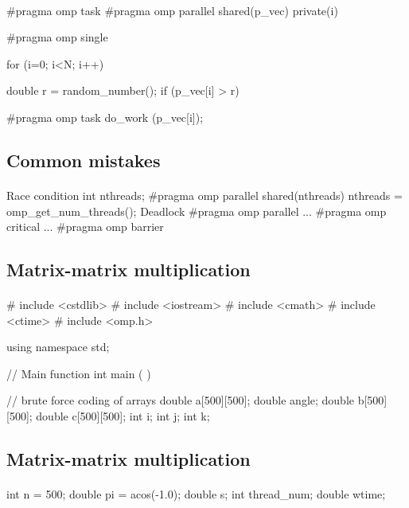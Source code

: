 \documentclass[%
oneside,                 %
final,                   %
10pt]{article}
\begin{document}
\paragraph{}
\bcppcod
#pragma omp task 
#pragma omp parallel shared(p_vec) private(i)
{
#pragma omp single
{
for (i=0; i<N; i++) {
double r = random_number();
if (p_vec[i] > r) {
#pragma omp task
do_work (p_vec[i]);
\ecppcod




\subsection{Common mistakes}

\paragraph{}
Race condition
\bcppcod
int nthreads;
#pragma omp parallel shared(nthreads)
{
nthreads = omp_get_num_threads();
}
\ecppcod
Deadlock
\bcppcod
#pragma omp parallel
{
...
#pragma omp critical
{
...
#pragma omp barrier
}
}
\ecppcod




\subsection{Matrix-matrix multiplication}

\paragraph{}
\bcppcod
# include <cstdlib>
# include <iostream>
# include <cmath>
# include <ctime>
# include <omp.h>

using namespace std;

// Main function
int main ( )
{
// brute force coding of arrays
  double a[500][500];
  double angle;
  double b[500][500];
  double c[500][500];
  int i;
  int j;
  int k;
\ecppcod




\subsection{Matrix-matrix multiplication}

\paragraph{}
\bcppcod
  int n = 500;
  double pi = acos(-1.0);
  double s;
  int thread_num;
  double wtime;

}}}}}
\end{document}
